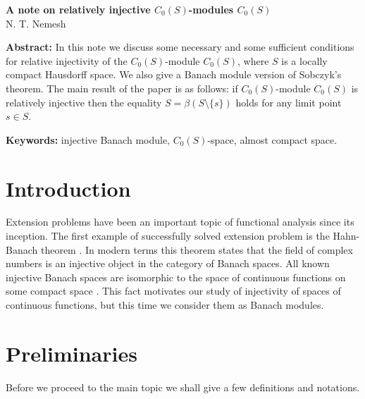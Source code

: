 \documentclass[12pt]{article}
\begin{document}
\begin{center}
    \Large \textbf{A note on relatively injective $C_0(S)$-modules $C_0(S)$}\\[0.5cm]
    \small {N. T. Nemesh}\\[0.5cm]
\end{center}

\thispagestyle{empty}

\medskip
\textbf{Abstract:} In this note we discuss some necessary and some sufficient conditions for relative injectivity of the $C_0(S)$-module $C_0(S)$, where $S$ is a locally compact Hausdorff space. We also give a Banach module version of Sobczyk's theorem. The main result of the paper is as follows: if $C_0(S)$-module $C_0(S)$ is relatively injective then the equality $S=\beta(S\setminus\{s\})$ holds for any limit point $s\in S$.
\medskip

\textbf{Keywords:} injective Banach module, $C_0(S)$-space, almost compact space.

\bigskip


\section{Introduction}
\label{SectionIntroduction}

Extension problems have been an important topic of functional analysis since its inception. The first example of successfully solved extension problem is the Hahn-Banach theorem \cite{HahnLinSystInLinSp,BanachOnLinFuncI,BanachOnLinFuncII}. In modern terms this theorem states that the field of complex numbers is an injective object in the category of Banach spaces. All known injective Banach spaces are isomorphic to the space of continuous functions on some compact space \cite{BlascIvorConstrInjSpCK}. This fact motivates our study of injectivity of spaces of continuous functions, but this time we consider them as Banach modules.


\section{Preliminaries}
\label{SectionPreliminaries}
Before we proceed to the main topic we shall give a few definitions and notations.
\end{document}
